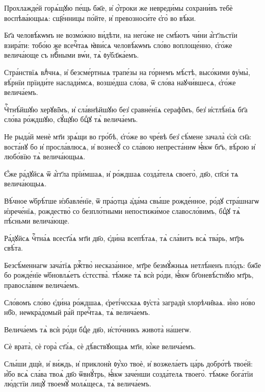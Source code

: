 \hKv Прохлажде́й горѧ́щꙋю пе́щь бж҃е, и҆ ѻ҆́троки же невреди́мы  сохрани́въ тебѐ воспѣва́ющыѧ: сщ҃е́нницы по́йте, и҆  превозноси́те є҆го̀ во вѣ́ки.  
%

\hKv Бг҃а человѣ́кѡмъ не возмо́жно ви́дѣти, на него́же не  смѣ́ютъ чи́ни а҆́гг҃льстїи взира́ти: тобо́ю же всечⷭ҇таѧ  ꙗ҆ви́сѧ человѣ́кѡмъ сло́во воплоще́нно, є҆го́же  велича́юще съ нбⷭ҇ными вѡ́и, тѧ̀ ᲂу҆бл҃жа́емъ. 
%

\hKv Стра́нствїѧ влⷣчнѧ, и҆  безсме́ртныѧ трапе́зы на го́рнемъ мѣ́стѣ, высо́кими  ᲂу҆мы̀, вѣ́рнїи прїиди́те наслади́мсѧ, возше́дша сло́ва,  ѿ сло́ва наꙋчи́вшесѧ, є҆го́же велича́емъ. 
%

\hKv Чⷭ҇тнѣ́йшꙋю херꙋві̑мъ, и҆  сла́внѣйшꙋю без̾ сравне́нїѧ серафі̑мъ, без̾ и҆стлѣ́нїѧ  бг҃а сло́ва ро́ждшꙋю, сꙋ́щꙋю бцⷣꙋ тѧ̀ велича́емъ. 
%

\hKv Не рыда́й менѐ мт҃и зрѧ́щи во  гро́бѣ, є҆го́же во чре́вѣ без̾ сѣ́мене зачала̀ є҆сѝ  сн҃а: воста́нꙋ бо и҆ просла́влюсѧ, и҆ вознесꙋ̀ со сла́вою  непреста́ннѡ ꙗ҆́кѡ бг҃ъ, вѣ́рою и҆ любо́вїю тѧ̀  велича́ющыѧ.  
%

\hKv Є҆́же ра́дꙋйсѧ ѿ а҆́гг҃ла прїи́мшаѧ, и҆ ро́ждшаѧ  созда́телѧ своего̀, дв҃о, сп҃си́ тѧ велича́ющыѧ. 

\hKv Вѣ́чное ѡ҆брѣ́тше и҆збавле́нїе, ѿ пра́ѻтца а҆да́ма  свы́ше рожде́нное, ро́дꙋ стра́шнагѡ и҆зрече́нїѧ, рождество̀  со безпло́тными непостижи́мое славосло́вимъ, бцⷣꙋ тѧ̀  пѣ́сньми велича́юще. 

\hKv Ра́дꙋйсѧ чⷭ҇тна́ѧ всест҃а́ѧ мт҃и дв҃о, є҆ди́на всепѣ́таѧ,  тѧ̀ сла́витъ всѧ̀ тва́рь, мт҃рь свѣ́та. 

\hKv Безсѣ́меннагѡ зача́тїѧ ржⷭ҇тво̀ несказа́нное, мт҃ре  безмꙋ́жныѧ нетлѣ́ненъ пло́дъ: бж҃їе бо рожде́нїе  ѡ҆бновлѧ́етъ є҆стєства̀. тѣ́мже тѧ̀ всѝ ро́ди, ꙗ҆́кѡ  бг҃оневѣ́стнꙋю мт҃рь, правосла́внѡ велича́емъ. 

\hKv Сло́вомъ сло́во є҆ди́на ро́ждшаѧ, є҆реті́чєскаѧ ᲂу҆ста̀  заградѝ ѕлорѣчи̑ваѧ. и҆́но но́во  нб҃о, неѡкра́домый ра́й пречⷭ҇таѧ, тѧ̀ велича́емъ. 

\hKv Велича́емъ тѧ̀ всѝ ро́ди бцⷣе дв҃о, и҆сто́чникъ живота̀  на́шегѡ. 

\hKv Сѐ врата̀, сѐ гора̀ ст҃а́ѧ, сѐ дѣ́вствꙋющаѧ мт҃и, ю҆́же  велича́емъ. 

\hKv Слы́ши дщѝ, и҆ ви́ждь, и҆ приклонѝ ᲂу҆́хо твоѐ, и҆  возжела́етъ ца́рь добро́тѣ твое́й: и҆́бо всѧ̀ сла́ва твоѧ̀  дв҃о ѿвнꙋ́трь, ꙗ҆́кѡ заче́нши созда́телѧ твоего̀. тѣ́мже  бога́тїи лю́дстїи лицꙋ̀ твоемꙋ̀ молѧ́щесѧ, тѧ̀ велича́емъ. 

